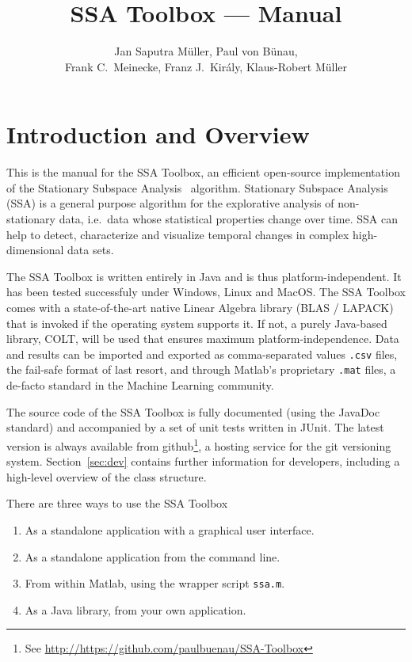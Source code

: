 \documentclass{article}
\newcommand{\1}{\ensuremath{\mathds{1}}}
\newcommand{\0}{\ensuremath{0}}
\begin{document}
\title{SSA Toolbox  --- Manual}
\author{Jan Saputra M\"uller, Paul von B\"unau, \\ Frank C.~Meinecke, Franz J.~Kir\'{a}ly, Klaus-Robert M\"uller}

\maketitle

\tableofcontents

\newpage

\section{Introduction and Overview}

This is the manual for the SSA Toolbox, an efficient open-source implementation of the 
Stationary Subspace Analysis~\cite{PRL:SSA:2009} algorithm. Stationary Subspace Analysis (SSA)
is a general purpose algorithm for the explorative analysis of non-stationary data, i.e.~data
whose statistical properties change over time. SSA can help to detect, characterize and 
visualize temporal changes in complex high-dimensional data sets.

The SSA Toolbox is written entirely in Java and is thus platform-independent. It has been tested
successfuly under Windows, Linux and MacOS. The SSA Toolbox comes with a state-of-the-art native 
Linear Algebra library (BLAS / LAPACK) that is invoked if the operating system supports 
it. If not, a purely Java-based library, COLT, will be used that ensures maximum platform-independence. 
Data and results can be imported and exported as comma-separated values \texttt{.csv} files, the fail-safe 
format of last resort, and through Matlab's proprietary \texttt{.mat} files, a de-facto standard in the 
Machine Learning community.

The source code of the SSA Toolbox is fully documented (using the JavaDoc standard) and accompanied
by a set of unit tests written in JUnit. The latest version is always available from 
github\footnote{See \url{http://https://github.com/paulbuenau/SSA-Toolbox}}, a hosting service for
the git versioning system. Section~\ref{sec:dev} contains further information for developers, 
including a high-level overview of the class structure.
 
There are three ways to use the SSA Toolbox
\begin{enumerate}
	\item As a standalone application with a graphical user interface.

	\item As a standalone application from the command line.
	 
	\item From within Matlab, using the wrapper script \texttt{ssa.m}. 

	\item As a Java library, from your own application.
\end{enumerate}
\end{document}
